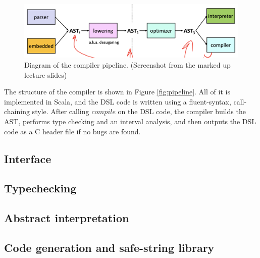 \documentclass[letterpaper]{article}
\begin{document}
\begin{figure}[h]
  \centering
  \includegraphics[width=\textwidth]{modern-compiler-pipeline.png}
  \caption{Diagram of the compiler pipeline. (Screenshot from the marked up lecture slides)}
  \label{fig:mdnpipeline}
\end{figure}

The structure of the compiler is shown in Figure \ref{fig:pipeline}. All of it
is implemented in Scala, and the DSL code is written using a fluent-syntax,
call-chaining style. After calling $compile$ on the DSL code, the compiler
builds the AST, performs type checking and an interval analysis, and then
outputs the DSL code as a C header file if no bugs are found.

\subsection{Interface}
\subsection{Typechecking}
\subsection{Abstract interpretation}
\subsection{Code generation and safe-string library}

\end{document}
